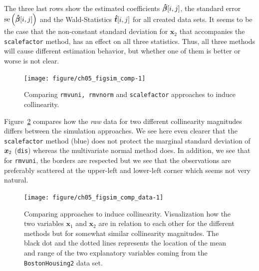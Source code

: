 \documentclass[11pt,a4paper,twoside]{book}\usepackage[]{graphicx}\usepackage[]{xcolor}
\newenvironment{knitrout}{}{} %
\begin{document}
The three last rows show the estimated coefficients ${\boldsymbol{\hat\beta}}[i,j]$, the standard error $\operatorname{se}\left({\boldsymbol{\hat\beta}}[i,j]\right)$ and the Wald-Statistics ${\boldsymbol{\hat{t}}}[i,j]$ for all created data sets. It seems to be the case that the non-constant standard deviation for $\boldsymbol{x}_2$ that accompanies the \texttt{scalefactor} method, has an effect on all three statistics.
Thus, all three methods will cause different estimation behavior, but whether one of them is better or worse is not clear.



\newpage

\begin{figure}[H]%
\begin{center}
\begin{knitrout}
\color{fgcolor}
\texttt{[image: figure/ch05\_figsim\_comp-1]} 
\end{knitrout}
\end{center}
\vspace{-1cm}
\caption{Comparing \texttt{rmvuni, rmvnorm} and \texttt{scalefactor} approaches to induce collinearity.}
\label{fig:sim_comp}
\end{figure}

\newpage

Figure~\ref{fig:sim_comp_data} compares how the \textit{raw} data for two different collinearity magnitudes differs between the simulation approaches. We see here even clearer that the \texttt{scalefactor} method (blue) does not protect the marginal standard deviation of ${\textbf{\textit{x}}}_2$ (\texttt{dis}) whereas the multivariate normal method does. In addition, we see that for \texttt{rmvuni}, the borders are respected but we see that the observations are preferably scattered at the upper-left and lower-left corner which seems not very natural.

\begin{figure}[H]%
\begin{center}
\begin{knitrout}
\color{fgcolor}
\texttt{[image: figure/ch05\_figsim\_comp\_data-1]} 
\end{knitrout}
\end{center}
\vspace{-1.2cm}
\caption{Comparing approaches to induce collinearity. Visualization how the two variables $\boldsymbol{x}_1$ and $\boldsymbol{x}_2$ are in relation to each other for the different methods but for somewhat similar collinearity magnitudes. The black dot and the dotted lines represents the location of the mean and range of the two explanatory variables coming from the \texttt{BostonHousing2} data set.}
\label{fig:sim_comp_data}
\end{figure}
\end{document}
